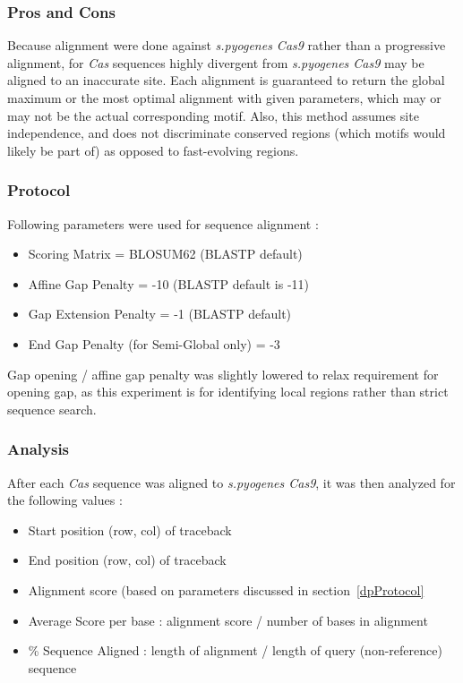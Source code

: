 \documentclass[11pt, oneside]{article}
\begin{document}
\subsubsection{Pros and Cons}

Because alignment were done against \textit{s.pyogenes Cas9} rather than a progressive alignment, for \textit{Cas} sequences highly divergent from \textit{s.pyogenes Cas9} may be aligned to an inaccurate site. Each alignment is guaranteed to return the global maximum or the most optimal alignment with given parameters, which may or may not be the actual corresponding motif. Also, this method assumes site independence, and does not discriminate conserved regions (which motifs would likely be part of) as opposed to fast-evolving regions. 


\subsubsection{Protocol} 
Following parameters were used for sequence alignment :
\begin{itemize}
\item Scoring Matrix = BLOSUM62 (BLASTP default)
\item Affine Gap Penalty = -10 (BLASTP default is -11)
\item Gap Extension Penalty = -1 (BLASTP default)
\item End Gap Penalty (for Semi-Global only) = -3
\end{itemize}

Gap opening / affine gap penalty was slightly lowered to relax requirement for opening gap, as this experiment is for identifying local regions rather than strict sequence search.


\subsubsection{Analysis}

After each \textit{Cas} sequence was aligned to \textit{s.pyogenes Cas9}, it was then analyzed for the following values :
\begin{itemize}
\item Start position (row, col) of traceback
\item End position (row, col) of traceback
\item Alignment score (based on parameters discussed in section~\ref{dpProtocol}
\item Average Score per base : alignment score / number of bases in alignment
\item \% Sequence Aligned : length of alignment / length of query (non-reference) sequence
\end{itemize}
\end{document}
